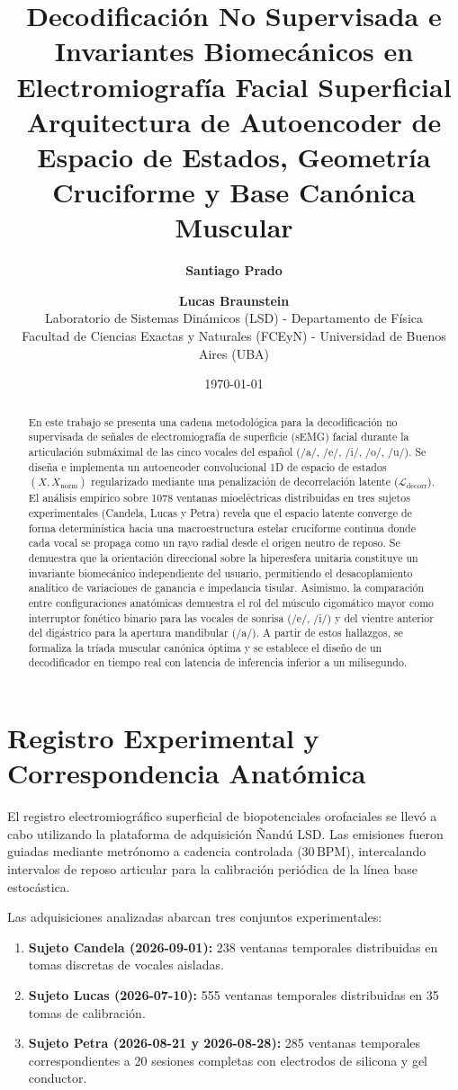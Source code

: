 \documentclass[11pt,a4paper]{article}
\title{\textbf{Decodificación No Supervisada e Invariantes Biomecánicos en Electromiografía Facial Superficial}\\
\large Arquitectura de Autoencoder de Espacio de Estados, Geometría Cruciforme y Base Canónica Muscular}
\author{\textbf{Santiago Prado} \and \textbf{Lucas Braunstein}\\
\small Laboratorio de Sistemas Dinámicos (LSD) - Departamento de Física\\
\small Facultad de Ciencias Exactas y Naturales (FCEyN) - Universidad de Buenos Aires (UBA)}
\date{\today}
\begin{document}
\maketitle

\begin{abstract}
En este trabajo se presenta una cadena metodológica para la decodificación no supervisada de señales de electromiografía de superficie (sEMG) facial durante la articulación submáximal de las cinco vocales del español (/a/, /e/, /i/, /o/, /u/). Se diseña e implementa un autoencoder convolucional 1D de espacio de estados $(X, \dot{X}_{\text{norm}})$ regularizado mediante una penalización de decorrelación latente ($\mathcal{L}_{\text{decorr}}$). El análisis empírico sobre 1078 ventanas mioeléctricas distribuidas en tres sujetos experimentales (Candela, Lucas y Petra) revela que el espacio latente converge de forma determinística hacia una macroestructura estelar cruciforme continua donde cada vocal se propaga como un rayo radial desde el origen neutro de reposo. Se demuestra que la orientación direccional sobre la hiperesfera unitaria constituye un invariante biomecánico independiente del usuario, permitiendo el desacoplamiento analítico de variaciones de ganancia e impedancia tisular. Asimismo, la comparación entre configuraciones anatómicas demuestra el rol del músculo cigomático mayor como interruptor fonético binario para las vocales de sonrisa (/e/, /i/) y del vientre anterior del digástrico para la apertura mandibular (/a/). A partir de estos hallazgos, se formaliza la tríada muscular canónica óptima y se establece el diseño de un decodificador en tiempo real con latencia de inferencia inferior a un milisegundo.
\end{abstract}

\vspace{0.5cm}

\section{Registro Experimental y Correspondencia Anatómica}
\label{sec:registro_experimental}

El registro electromiográfico superficial de biopotenciales orofaciales se llevó a cabo utilizando la plataforma de adquisición Ñandú LSD. Las emisiones fueron guiadas mediante metrónomo a cadencia controlada ($30\,\text{BPM}$), intercalando intervalos de reposo articular para la calibración periódica de la línea base estocástica.

Las adquisiciones analizadas abarcan tres conjuntos experimentales:
\begin{enumerate}
    \item \textbf{Sujeto Candela (2026-09-01):} 238 ventanas temporales distribuidas en tomas discretas de vocales aisladas.
    \item \textbf{Sujeto Lucas (2026-07-10):} 555 ventanas temporales distribuidas en 35 tomas de calibración.
    \item \textbf{Sujeto Petra (2026-08-21 y 2026-08-28):} 285 ventanas temporales correspondientes a 20 sesiones completas con electrodos de silicona y gel conductor.
\end{enumerate}
\end{document}
